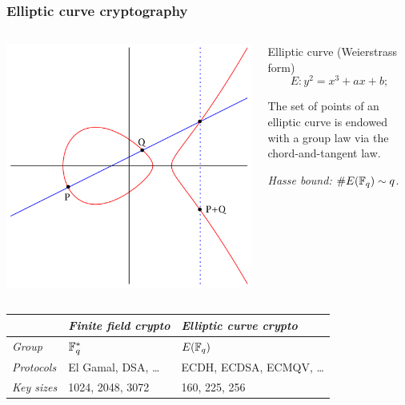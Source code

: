 \documentclass[10pt,usepdftitle=false]{beamer}
\begin{document}
\begin{frame}
  \frametitle{Elliptic curve cryptography}

  \vspace{-1mm}

  \begin{columns}
    \begin{column}{0.4\textwidth}
      \includegraphics[width=\textwidth]{../isogeny/ec-add.pdf}
    \end{column}
    \begin{column}{0.55\textwidth}
      \begin{block}{Elliptic curve (Weierstrass form)}
        \[E : y^2 = x^3 + ax + b\text{;}\]
      
        The set of points of an elliptic curve is endowed with a group
        law via the chord-and-tangent law.
      \end{block}
    
      \begin{block}{}
        \emph{Hasse bound:} $\# E(\mathbb{F}_q) \sim q$.
      \end{block}
    \end{column}
  \end{columns}

  \begin{center}
    \begin{tabular}{l | l | l}
      &\emph{\textbf{Finite field crypto}} & \emph{\textbf{Elliptic curve crypto}}\\
      \hline
      \emph{Group} & $\mathbb{F}_q^\ast$ & $E(\mathbb{F}_q)$\\
      \emph{Protocols} & El Gamal, DSA, \dots & ECDH, ECDSA, ECMQV, \dots\\
      \emph{Key sizes} & 1024, 2048, 3072 & 160, 225, 256 \\
    \end{tabular}
  \end{center}

\end{frame}
\end{document}
